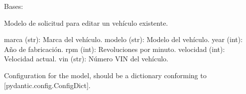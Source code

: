 \documentclass[letterpaper,10pt,spanish]{sphinxmanual}
\begin{document}
\begin{fulllineitems}
\label{\detokenize{endpoints:main.VehiculoEdicion}}
\pysigstartsignatures
\pysiglinewithargsret
{}
{\sphinxparamcomma {}\sphinxparamcomma {}\sphinxparamcomma {}\sphinxparamcomma {}\sphinxparamcomma {}\sphinxparamcomma {}}
{}
\pysigstopsignatures
\sphinxAtStartPar
Bases: 

\sphinxAtStartPar
Modelo de solicitud para editar un vehículo existente.
\begin{description}
\sphinxAtStartPar
marca (str): Marca del vehículo.
modelo (str): Modelo del vehículo.
year (int): Año de fabricación.
rpm (int): Revoluciones por minuto.
velocidad (int): Velocidad actual.
vin (str): Número VIN del vehículo.

\end{description}

\begin{fulllineitems}
\label{\detokenize{endpoints:main.VehiculoEdicion.marca}}
\pysigstartsignatures
\pysigline
{}
\pysigstopsignatures
\end{fulllineitems}


\begin{fulllineitems}
\label{\detokenize{endpoints:main.VehiculoEdicion.model_config}}
\pysigstartsignatures
\pysigline
{}
\pysigstopsignatures
\sphinxAtStartPar
Configuration for the model, should be a dictionary conforming to {[}\sphinxtitleref{ConfigDict}{]}{[}pydantic.config.ConfigDict{]}.


\end{fulllineitems}
\end{fulllineitems}
\end{document}
